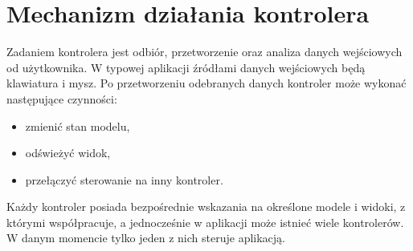 \documentclass{article}
\begin{document}
\section{Mechanizm działania kontrolera}
Zadaniem kontrolera jest odbiór, przetworzenie oraz analiza danych wejściowych od użytkownika. W typowej aplikacji źródłami danych wejściowych będą klawiatura i mysz. Po przetworzeniu odebranych danych kontroler może wykonać następujące czynności:
\begin{itemize}
\item zmienić stan modelu,
\item odświeżyć widok,
\item przełączyć sterowanie na inny kontroler.

\end{itemize}
    
Każdy kontroler posiada bezpośrednie wskazania na określone modele i widoki, z którymi współpracuje, a jednocześnie w aplikacji może istnieć wiele kontrolerów. W danym momencie tylko jeden z nich steruje aplikacją.
\end{document}
